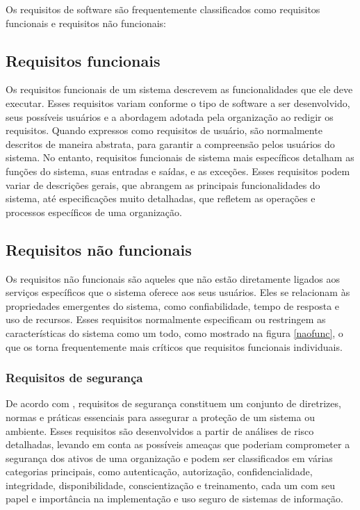     Os requisitos de software são frequentemente classificados como requisitos funcionais e requisitos não funcionais:
    
    \subsection{Requisitos funcionais}
    Os requisitos funcionais de um sistema descrevem as funcionalidades que ele deve executar. Esses requisitos variam conforme o tipo de software a ser desenvolvido, seus possíveis usuários e a abordagem adotada pela organização ao redigir os requisitos. Quando expressos como requisitos de usuário, são normalmente descritos de maneira abstrata, para garantir a compreensão pelos usuários do sistema. No entanto, requisitos funcionais de sistema mais específicos detalham as funções do sistema, suas entradas e saídas, e as exceções. Esses requisitos podem variar de descrições gerais, que abrangem as principais funcionalidades do sistema, até especificações muito detalhadas, que refletem as operações e processos específicos de uma organização.
    
    \subsection{Requisitos não funcionais}
    Os requisitos não funcionais são aqueles que não estão diretamente ligados aos serviços específicos que o sistema oferece aos seus usuários. Eles se relacionam às propriedades emergentes do sistema, como confiabilidade, tempo de resposta e uso de recursos. Esses requisitos normalmente especificam ou restringem as características do sistema como um todo, como mostrado na figura \ref{naofunc}, o que os torna frequentemente mais críticos que requisitos funcionais individuais.
    
    
    \subsubsection{Requisitos de segurança}
    De acordo com , requisitos de segurança constituem um conjunto de diretrizes, normas e práticas essenciais para assegurar a proteção de um sistema ou ambiente. Esses requisitos são desenvolvidos a partir de análises de risco detalhadas, levando em conta as possíveis ameaças que poderiam comprometer a segurança dos ativos de uma organização e podem ser classificados em várias categorias principais, como autenticação, autorização, confidencialidade, integridade, disponibilidade, conscientização e treinamento, cada um com seu papel e importância na implementação e uso seguro de sistemas de informação.

